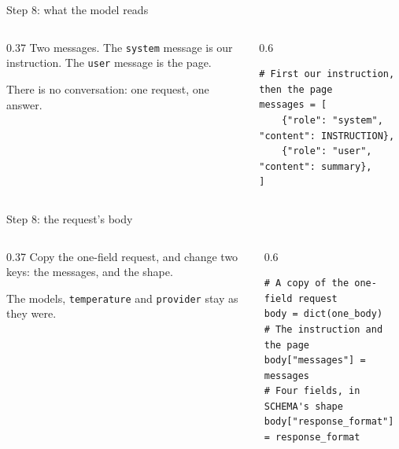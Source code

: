 \documentclass[9pt,aspectratio=169]{beamer}
\begin{document}
\begin{frame}[fragile]{Step 8: what the model reads}
    \begin{columns}[T]
        \begin{column}{0.37\textwidth}
            Two messages. The \texttt{system} message is our instruction. The \texttt{user} message is the page.

            \medskip
            There is no conversation: one request, one answer.
        \end{column}
        \begin{column}{0.6\textwidth}
\begin{lstlisting}
# First our instruction, then the page
messages = [
    {"role": "system", "content": INSTRUCTION},
    {"role": "user", "content": summary},
]
\end{lstlisting}
        \end{column}
    \end{columns}
\end{frame}

\begin{frame}[fragile]{Step 8: the request's body}
    \begin{columns}[T]
        \begin{column}{0.37\textwidth}
            Copy the one-field request, and change two keys: the messages, and the shape.

            \medskip
            The models, \texttt{temperature} and \texttt{provider} stay as they were.
        \end{column}
        \begin{column}{0.6\textwidth}
\begin{lstlisting}
# A copy of the one-field request
body = dict(one_body)
# The instruction and the page
body["messages"] = messages
# Four fields, in SCHEMA's shape
body["response_format"] = response_format
\end{lstlisting}
        \end{column}
    \end{columns}
\end{frame}
\end{document}
